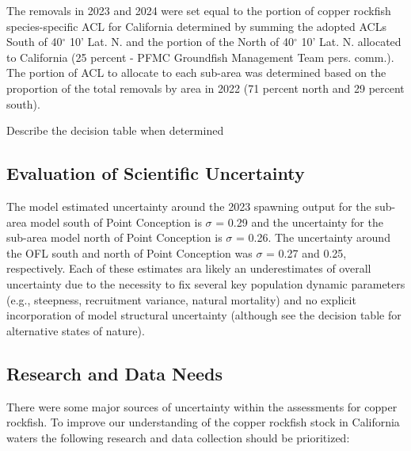 \documentclass[11pt,
  english,
  letterpaper,
]{article}
\begin{document}
The removals in 2023 and 2024 were set equal to the portion of copper rockfish species-specific ACL for California determined by summing the adopted ACLs South of 40\(^\circ\) 10' Lat. N. and the portion of the North of 40\(^\circ\) 10' Lat. N. allocated to California (25 percent - PFMC Groundfish Management Team pers. comm.). The portion of ACL to allocate to each sub-area was determined based on the proportion of the total removals by area in 2022 (71 percent north and 29 percent south).

Describe the decision table when determined

\hypertarget{evaluation-of-scientific-uncertainty}{%
\subsection{Evaluation of Scientific Uncertainty}\label{evaluation-of-scientific-uncertainty}}

The model estimated uncertainty around the 2023 spawning output for the sub-area model south of Point Conception is \(\sigma\) = 0.29 and the uncertainty for the sub-area model north of Point Conception is \(\sigma\) = 0.26. The uncertainty around the OFL south and north of Point Conception was \(\sigma\) = 0.27 and 0.25, respectively. Each of these estimates ara likely an underestimates of overall uncertainty due to the necessity to fix several key population dynamic parameters (e.g., steepness, recruitment variance, natural mortality) and no explicit incorporation of model structural uncertainty (although see the decision table for alternative states of nature).

\hypertarget{research-and-data-needs-1}{%
\subsection{Research and Data Needs}\label{research-and-data-needs-1}}

There were some major sources of uncertainty within the assessments for copper rockfish. To improve our understanding of the copper rockfish stock in California waters the following research and data collection should be prioritized:
\end{document}
